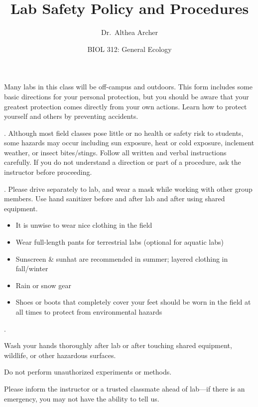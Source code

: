 \documentclass{tufte-handout}
\title{Lab Safety Policy and Procedures}										%
\author{Dr.\ Althea Archer}										%
\date{BIOL 312: General Ecology}
\begin{document}
\maketitle


\begin{fullwidth}

Many labs in this class will be off-campus and outdoors. This form includes some basic directions for your personal protection, but you should be aware that your greatest protection comes directly from your own actions. Learn how to protect yourself and others by preventing accidents. 

. Although most field classes pose little or no health or safety risk to students, some hazards may occur including sun exposure, heat or cold exposure, inclement weather, or insect bites/stings. Follow all written and verbal instructions carefully. If you do not understand a direction or part of a procedure, ask the instructor before proceeding.

.  Please drive separately to lab, and wear a mask while working with other group members. Use hand sanitizer before and after lab and after using shared equipment.


\begin{itemize}
\item It is unwise to wear nice clothing in the field
\item Wear full-length pants for terrestrial labs (optional for aquatic labs)
\item Sunscreen \& sunhat are recommended in summer; layered clothing in fall/winter
\item Rain or snow gear
\item Shoes or boots that completely cover your feet should be worn in the field at all times to protect from environmental hazards
\end{itemize}

. 

 Wash your hands thoroughly after lab or after touching shared equipment, wildlife, or other hazardous surfaces.

 Do not perform unauthorized experiments or methods.


 Please inform the instructor or a trusted classmate ahead of lab---if there is an emergency, you may not have the ability to tell us.

\end{fullwidth}
\end{document}
